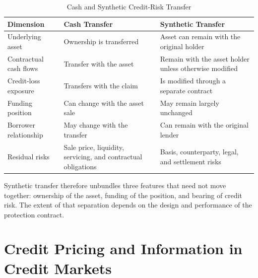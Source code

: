 \begin{table}[H]

\centering

\caption{Cash and Synthetic Credit-Risk Transfer}

\label{tab:ch19-cash-synthetic}

\begin{tabularx}{\textwidth}{@{}p{3.4cm}YY@{}}

\toprule

\textbf{Dimension} &
\textbf{Cash Transfer} &
\textbf{Synthetic Transfer} \\

\midrule

Underlying asset &
Ownership is transferred &
Asset can remain with the original holder \\

Contractual cash flows &
Transfer with the asset &
Remain with the asset holder unless otherwise modified \\

Credit-loss exposure &
Transfers with the claim &
Is modified through a separate contract \\

Funding position &
Can change with the asset sale &
May remain largely unchanged \\

Borrower relationship &
May change with the transfer &
Can remain with the original lender \\

Residual risks &
Sale price, liquidity, servicing, and contractual obligations &
Basis, counterparty, legal, and settlement risks \\

\bottomrule

\end{tabularx}

\end{table}

Synthetic transfer therefore unbundles three features that need not move together: ownership of the asset, funding of the position, and bearing of credit risk. The extent of that separation depends on the design and performance of the protection contract.


\section[Credit Pricing and Information in Credit Markets]{Credit Pricing and Information in Credit Markets}

